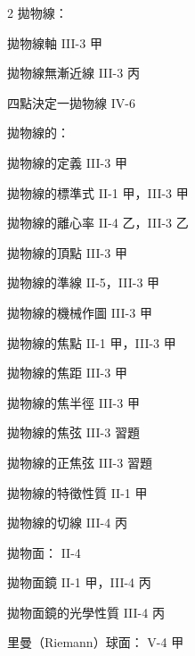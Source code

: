 \begin{multicols}{2}
\noindent 拋物線：\par
\noindent\hspace*{1.5em} 拋物線軸 \hfill III-3 甲\par
\noindent\hspace*{1.5em} 拋物線無漸近線 \hfill III-3 丙\par
\noindent\hspace*{1.5em} 四點決定一拋物線 \hfill IV-6\par
\noindent 拋物線的：\par
\noindent\hspace*{1.5em} 拋物線的定義 \hfill III-3 甲\par
\noindent\hspace*{1.5em} 拋物線的標準式 \hfill II-1 甲，III-3 甲\par
\noindent\hspace*{1.5em} 拋物線的離心率 \hfill II-4 乙，III-3 乙\par
\noindent\hspace*{1.5em} 拋物線的頂點 \hfill III-3 甲\par
\noindent\hspace*{1.5em} 拋物線的準線 \hfill II-5，III-3 甲\par
\noindent\hspace*{1.5em} 拋物線的機械作圖 \hfill III-3 甲\par
\noindent\hspace*{1.5em} 拋物線的焦點 \hfill II-1 甲，III-3 甲\par
\noindent\hspace*{1.5em} 拋物線的焦距 \hfill III-3 甲\par
\noindent\hspace*{1.5em} 拋物線的焦半徑 \hfill III-3 甲\par
\noindent\hspace*{1.5em} 拋物線的焦弦 \hfill III-3 習題\par
\noindent\hspace*{1.5em} 拋物線的正焦弦 \hfill III-3 習題\par
\noindent\hspace*{1.5em} 拋物線的特徵性質 \hfill II-1 甲\par
\noindent\hspace*{1.5em} 拋物線的切線 \hfill III-4 丙\par
\noindent 拋物面： \hfill II-4\par
\noindent\hspace*{1.5em} 拋物面鏡 \hfill II-1 甲，III-4 丙\par
\noindent\hspace*{1.5em} 拋物面鏡的光學性質 \hfill III-4 丙\par
\noindent 里曼（Riemann）球面： \hfill V-4 甲\par


\end{multicols}
